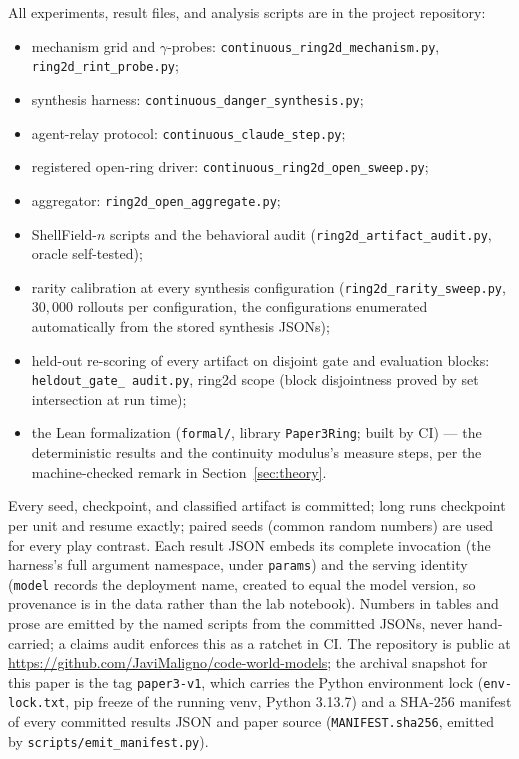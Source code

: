 \documentclass[11pt]{article}
\theoremstyle{remark}
\begin{document}
All experiments, result files, and analysis scripts are in the project
repository:
\begin{itemize}
\item mechanism grid and $\gamma$-probes:
  \texttt{continuous\_ring2d\_mechanism.py},
  \texttt{ring2d\_rint\_probe.py};
\item synthesis harness: \texttt{continuous\_danger\_synthesis.py};
\item agent-relay protocol: \texttt{continuous\_claude\_step.py};
\item registered open-ring driver:
  \texttt{continuous\_ring2d\_open\_sweep.py};
\item aggregator: \texttt{ring2d\_open\_aggregate.py};
\item ShellField-$n$ scripts and the behavioral audit
  (\texttt{ring2d\_artifact\_audit.py}, oracle self-tested);
\item rarity calibration at every synthesis configuration
  (\texttt{ring2d\_rarity\_sweep.py}, $30{,}000$ rollouts per
  configuration, the configurations enumerated automatically from the
  stored synthesis JSONs);
\item held-out re-scoring of every artifact on disjoint gate and
  evaluation blocks: \texttt{heldout\_\allowbreak gate\_\allowbreak
  audit.py}, ring2d scope (block disjointness proved by set intersection
  at run time);
\item the Lean formalization (\texttt{formal/}, library
  \texttt{Paper3Ring}; built by CI) --- the deterministic results and the
  continuity modulus's measure steps, per the machine-checked remark in
  Section~\ref{sec:theory}.
\end{itemize}
Every seed, checkpoint, and classified artifact is committed; long runs
checkpoint per unit and resume exactly; paired seeds (common random
numbers) are used for every play contrast. Each result JSON embeds its
complete invocation (the harness's full argument namespace, under
\texttt{params}) and the serving identity (\texttt{model} records the
deployment name, created to equal the model version, so provenance is in
the data rather than the lab notebook). Numbers in tables and prose are
emitted by the named scripts from the committed JSONs, never hand-carried;
a claims audit enforces this as a ratchet in CI. The repository is
public at \url{https://github.com/JaviMaligno/code-world-models}; the
archival snapshot for this paper is the tag \texttt{paper3-v1}, which
carries the Python environment lock (\texttt{env-lock.txt}, pip freeze
of the running venv, Python 3.13.7) and a SHA-256 manifest of every
committed results JSON and paper source
(\texttt{MANIFEST.sha256}, emitted by
\texttt{scripts/emit\_manifest.py}).


\end{document}
